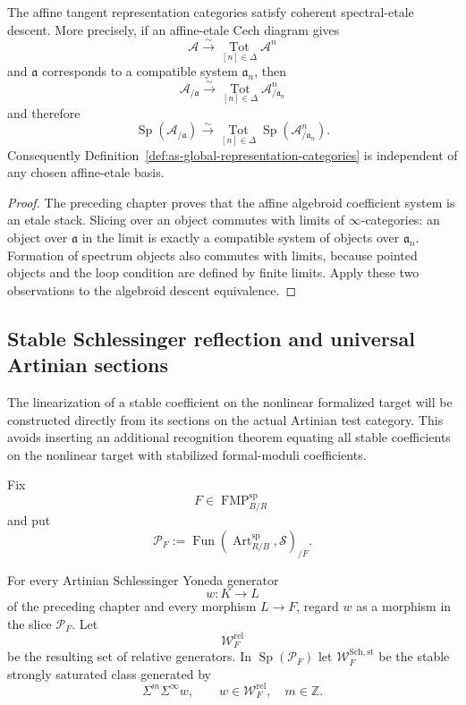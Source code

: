 \begin{proposition}
\label{prop:as-representation-etale-descent}
The affine tangent representation categories satisfy coherent
spectral-etale descent.  More precisely, if an affine-etale Cech diagram gives
\[
    \mathcal A
    \xrightarrow{\sim}
    \operatorname*{Tot}_{[n]\in\Delta}\mathcal A^n
\]
and $\mathfrak a$ corresponds to a compatible system $\mathfrak a_n$, then
\[
\boxed{
    \mathcal A_{/\mathfrak a}
    \xrightarrow{\sim}
    \operatorname*{Tot}_{[n]\in\Delta}
    \mathcal A^n_{/\mathfrak a_n}
}
\]
and therefore
\[
\boxed{
    \operatorname{Sp}(\mathcal A_{/\mathfrak a})
    \xrightarrow{\sim}
    \operatorname*{Tot}_{[n]\in\Delta}
    \operatorname{Sp}(\mathcal A^n_{/\mathfrak a_n}).
}
\]
Consequently Definition~\ref{def:as-global-representation-categories} is
independent of any chosen affine-etale basis.
\end{proposition}

\begin{proof}
The preceding chapter proves that the affine algebroid coefficient system is
an etale stack.  Slicing over an object commutes with limits of
$\infty$-categories: an object over $\mathfrak a$ in the limit is exactly a
compatible system of objects over $\mathfrak a_n$.  Formation of spectrum
objects also commutes with limits, because pointed objects and the loop
condition are defined by finite limits.  Apply these two observations to the
algebroid descent equivalence.
\end{proof}

\subsection{Stable Schlessinger reflection and universal Artinian sections}

The linearization of a stable coefficient on the nonlinear formalized target
will be constructed directly from its sections on the actual Artinian test
category.  This avoids inserting an additional recognition theorem equating
all stable coefficients on the nonlinear target with stabilized formal-moduli
coefficients.

Fix
\[
    F\in\operatorname{FMP}^{\mathrm{sp}}_{B/R}
\]
and put
\[
    \mathcal P_F
    :=
    \operatorname{Fun}
    \left(
        \operatorname{Art}^{\mathrm{sp}}_{R/B},
        \mathcal S
    \right)_{/F}.
\]

\begin{construction}
\label{con:as-relative-stable-schlessinger-generators}
For every Artinian Schlessinger Yoneda generator
\[
    w:K\longrightarrow L
\]
of the preceding chapter and every morphism $L\to F$, regard $w$ as a
morphism in the slice $\mathcal P_F$.  Let
\[
    \mathcal W_F^{\mathrm{rel}}
\]
be the resulting set of relative generators.  In
$\operatorname{Sp}(\mathcal P_F)$ let
$\mathcal W_F^{\mathrm{Sch,st}}$ be the stable strongly saturated class
generated by
\[
    \Sigma^m\Sigma^\infty w,
    \qquad
    w\in\mathcal W_F^{\mathrm{rel}},\quad m\in\mathbb Z.
\]
\end{construction}

